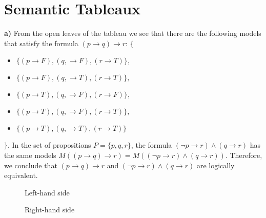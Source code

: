 \documentclass[]{article}
\begin{document}
\section{Semantic Tableaux}
\textbf{a)} From the open leaves of the tableau we see that there are the following models that satisfy the formula $(p\rightarrow q) \rightarrow r$: $\{$
\begin{itemize}[noitemsep]
\item[] $\{(p\rightarrow F), (q, \rightarrow F), (r\rightarrow T)\},$
\item[] $\{(p\rightarrow F), (q, \rightarrow T), (r\rightarrow T)\},$
\item[] $\{(p\rightarrow T), (q, \rightarrow F), (r\rightarrow F)\},$
\item[] $\{(p\rightarrow T), (q, \rightarrow F), (r\rightarrow T)\},$
\item[] $\{(p\rightarrow T), (q, \rightarrow T), (r\rightarrow T)\}$
\end{itemize}$\}$. 
In the set of propositions $P = \{p, q, r\}$, the
formula $(\neg p \rightarrow r) \wedge (q \rightarrow r)$ has the same models $M((p\rightarrow q) \rightarrow r) = M((\neg p \rightarrow r) \wedge (q \rightarrow r))$. Therefore, we conclude that $(p\rightarrow q) \rightarrow r$ and $(\neg p \rightarrow r) \wedge (q \rightarrow r)$ are logically equivalent.

\begin{figure}[h]
\centering
{}
\caption{Left-hand side} \label{fig:LHS}
\end{figure}

\begin{figure}[h]
\centering
{}
\caption{Right-hand side} \label{fig:RHS}
\end{figure}
\end{document}
